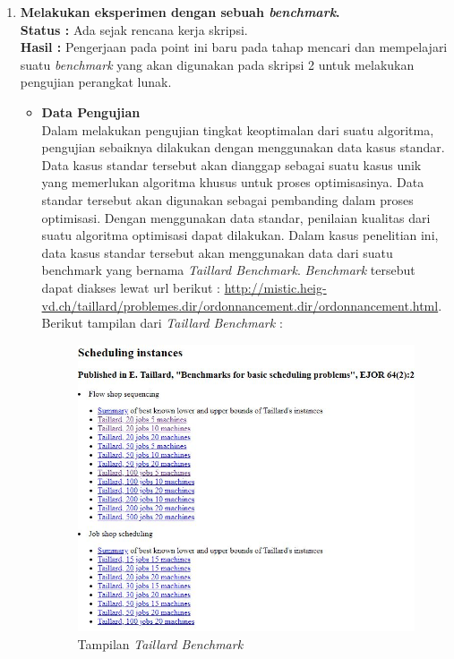 \documentclass[a4paper,twoside]{article}
\begin{document}
\begin{enumerate}
	    \newpage
		\item \textbf{Melakukan eksperimen dengan sebuah {\it benchmark}.}\\
		{\bf Status :} Ada sejak rencana kerja skripsi.\\
		{\bf Hasil :} Pengerjaan pada point ini baru pada tahap mencari dan mempelajari suatu {\it benchmark} yang akan digunakan pada skripsi 2 untuk melakukan pengujian perangkat lunak.
		\begin{itemize}
		\item {\bf Data Pengujian}\\
				   Dalam melakukan pengujian tingkat keoptimalan dari suatu algoritma, pengujian sebaiknya dilakukan dengan menggunakan data kasus standar. Data kasus standar tersebut akan dianggap sebagai suatu kasus unik yang memerlukan algoritma khusus untuk proses optimisasinya. Data standar tersebut akan digunakan sebagai pembanding dalam proses optimisasi. 
			       Dengan menggunakan data	standar, penilaian kualitas dari suatu algoritma optimisasi dapat dilakukan. Dalam kasus penelitian ini, data kasus standar tersebut akan menggunakan data dari suatu benchmark yang bernama {\it Taillard Benchmark}. {\it Benchmark} tersebut dapat diakses lewat url berikut : \url{http://mistic.heig-vd.ch/taillard/problemes.dir/ordonnancement.dir/ordonnancement.html}.
				   Berikut tampilan dari {\it Taillard Benchmark} : 
				   
				   \begin{figure}[H]
				   	\centering
				   	\includegraphics[scale=0.85]{gambar15}
				   	\caption[TaillardBenchmatk] {Tampilan {\it Taillard Benchmark}}
				   	\label{fig:taillardbenchmark}
				   \end{figure}
		

\end{itemize}
\end{enumerate}
\end{document}
